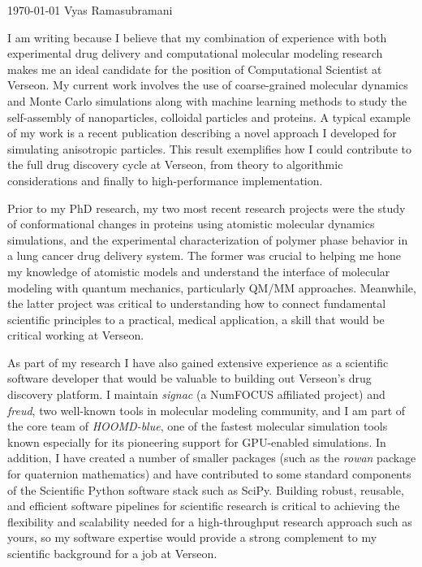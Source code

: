 \documentclass[11pt, a4paper]{awesome-cv}
\begin{document}
\makecvheader[R]

\makecvfooter
  {\today}
  {Vyas Ramasubramani}
  {}

\makelettertitle

\begin{cvletter}
    I am writing because I believe that my combination of experience with both experimental drug delivery and computational molecular modeling research makes me an ideal candidate for the position of Computational Scientist at Verseon.
    My current work involves the use of coarse-grained molecular dynamics and Monte Carlo simulations along with machine learning methods to study the self-assembly of nanoparticles, colloidal particles and proteins.
    A typical example of my work is a recent publication describing a novel approach I developed for simulating anisotropic particles.
    This result exemplifies how I could contribute to the full drug discovery cycle at Verseon, from theory to algorithmic considerations and finally to high-performance implementation.

    Prior to my PhD research, my two most recent research projects were the study of conformational changes in proteins using atomistic molecular dynamics simulations, and the experimental characterization of polymer phase behavior in a lung cancer drug delivery system.
    The former was crucial to helping me hone my knowledge of atomistic models and understand the interface of molecular modeling with quantum mechanics, particularly QM/MM approaches.
    Meanwhile, the latter project was critical to understanding how to connect fundamental scientific principles to a practical, medical application, a skill that would be critical working at Verseon.

    As part of my research I have also gained extensive experience as a scientific software developer that would be valuable to building out Verseon's drug discovery platform.
    I maintain \emph{signac} (a NumFOCUS affiliated project) and \emph{freud}, two well-known tools in molecular modeling community, and I am part of the core team of \emph{HOOMD-blue}, one of the fastest molecular simulation tools known especially for its pioneering support for GPU-enabled simulations.
    In addition, I have created a number of smaller packages (such as the \emph{rowan} package for quaternion mathematics) and have contributed to some standard components of the Scientific Python software stack such as SciPy. 
    Building robust, reusable, and efficient software pipelines for scientific research is critical to achieving the flexibility and scalability needed for a high-throughput research approach such as yours, so my software expertise would provide a strong complement to my scientific background for a job at Verseon.


\end{cvletter}
\end{document}
